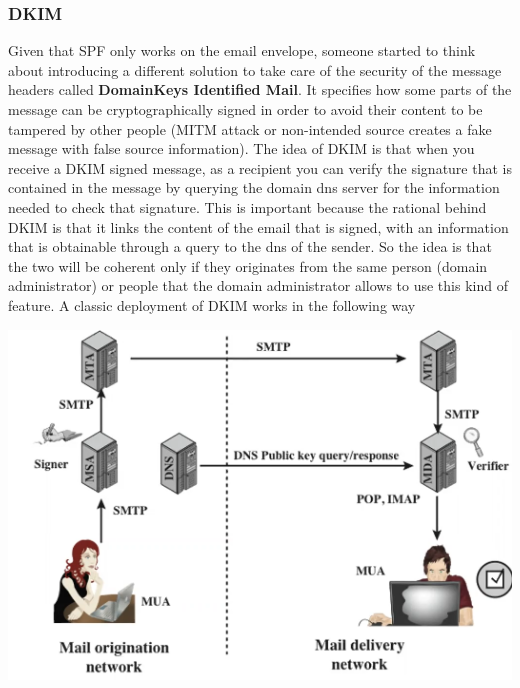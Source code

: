\subsubsection{DKIM}
Given that SPF only works on the email envelope, someone started to think about introducing a different solution to take care of the security of the message headers called \textbf{DomainKeys Identified Mail}. It specifies how some parts of the message can be cryptographically signed in order to avoid their content to be tampered by other people (MITM attack or non-intended source creates a fake message with false source information). The idea of DKIM is that when you receive a DKIM signed message, as a recipient you can verify the signature that is contained in the message by querying the domain dns server for the information needed to check that signature. This is important because the rational behind DKIM is that it links the content of the email that is signed, with an information that is obtainable through a query to the dns of the sender. So the idea is that the two will be coherent only if they originates from the same person (domain administrator) or people that the domain administrator allows to use this kind of feature. A classic deployment of DKIM works in the following way
\begin{center}
\includegraphics[scale=0.4]{./images/dkim_deployment.png}
\end{center}
